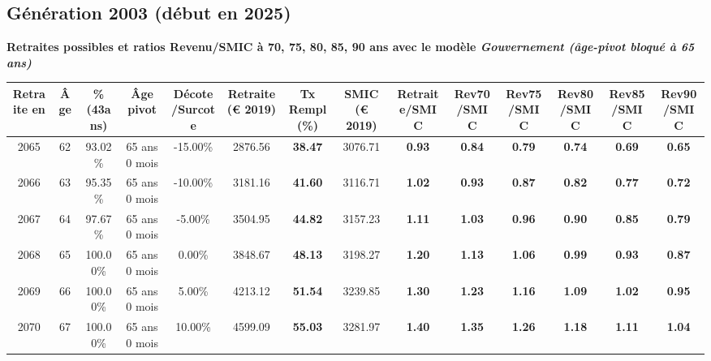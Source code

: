 \newpage 
 
\subsection{Génération 2003 (début en 2025)} 

{\bf \noindent Retraites possibles et ratios Revenu/SMIC à 70, 75, 80, 85, 90 ans avec le modèle \emph{Gouvernement (âge-pivot bloqué à 65 ans)}}  
 
\begin{adjustbox}{max width=\textwidth} 
\begin{tabular}[htb]{|c|c||c|c|c||c|c||c||c|c|c|c|c|c|} 
\hline 
 Retraite en &  Âge &  \%(43ans) &  Âge pivot &  Décote/Surcote &  Retraite (\euro{} 2019) &  Tx Rempl(\%) &  SMIC (\euro{} 2019) &  Retraite/SMIC &  Rev70/SMIC &  Rev75/SMIC &  Rev80/SMIC &  Rev85/SMIC &  Rev90/SMIC \\ 
\hline \hline 
 2065 &  62 &  93.02\% &  65 ans 0 mois &  -15.00\% &  2876.56 &  {\bf 38.47} &  3076.71 &  {\bf {\color{red} 0.93}} &  {\bf {\color{red} 0.84}} &  {\bf {\color{red} 0.79}} &  {\bf {\color{red} 0.74}} &  {\bf {\color{red} 0.69}} &  {\bf {\color{red} 0.65}} \\ 
\hline 
 2066 &  63 &  95.35\% &  65 ans 0 mois &  -10.00\% &  3181.16 &  {\bf 41.60} &  3116.71 &  {\bf 1.02} &  {\bf {\color{red} 0.93}} &  {\bf {\color{red} 0.87}} &  {\bf {\color{red} 0.82}} &  {\bf {\color{red} 0.77}} &  {\bf {\color{red} 0.72}} \\ 
\hline 
 2067 &  64 &  97.67\% &  65 ans 0 mois &  -5.00\% &  3504.95 &  {\bf 44.82} &  3157.23 &  {\bf 1.11} &  {\bf 1.03} &  {\bf {\color{red} 0.96}} &  {\bf {\color{red} 0.90}} &  {\bf {\color{red} 0.85}} &  {\bf {\color{red} 0.79}} \\ 
\hline 
 2068 &  65 &  100.00\% &  65 ans 0 mois &  0.00\% &  3848.67 &  {\bf 48.13} &  3198.27 &  {\bf 1.20} &  {\bf 1.13} &  {\bf 1.06} &  {\bf {\color{red} 0.99}} &  {\bf {\color{red} 0.93}} &  {\bf {\color{red} 0.87}} \\ 
\hline 
 2069 &  66 &  100.00\% &  65 ans 0 mois &  5.00\% &  4213.12 &  {\bf 51.54} &  3239.85 &  {\bf 1.30} &  {\bf 1.23} &  {\bf 1.16} &  {\bf 1.09} &  {\bf 1.02} &  {\bf {\color{red} 0.95}} \\ 
\hline 
 2070 &  67 &  100.00\% &  65 ans 0 mois &  10.00\% &  4599.09 &  {\bf 55.03} &  3281.97 &  {\bf 1.40} &  {\bf 1.35} &  {\bf 1.26} &  {\bf 1.18} &  {\bf 1.11} &  {\bf 1.04} \\ 
\hline 
\hline 
\end{tabular} 
\end{adjustbox} 
 
